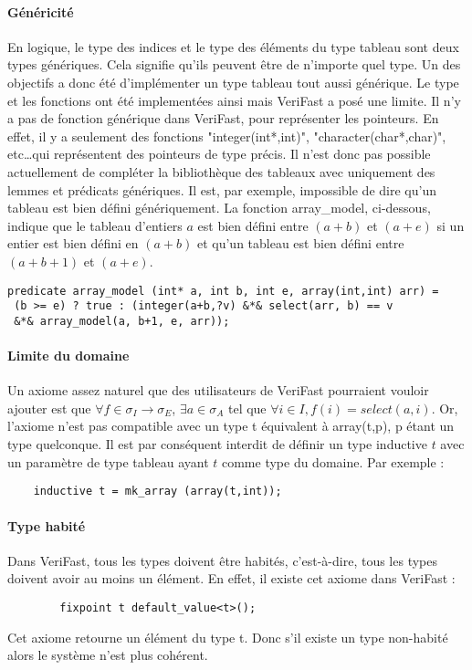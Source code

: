 \documentclass[11pt,openany]{article}
\newcommand{\verifast}{VeriFast}
\begin{document}
			\paragraph{G\'en\'ericit\'e}
			En logique, le type des indices et le type des \'el\'ements du type tableau sont deux types g\'en\'eriques. Cela signifie qu'ils peuvent \^etre de n'importe quel type. Un des objectifs a donc \'et\'e d'impl\'ementer un type tableau tout aussi g\'en\'erique. Le type et les fonctions ont \'et\'e implement\'ees ainsi mais \verifast{} a pos\'e une limite. Il n'y a pas de fonction g\'en\'erique dans \verifast, pour repr\'esenter les pointeurs. En effet, il y a seulement des fonctions "integer(int*,int)", "character(char*,char)", etc\ldots qui repr\'esentent des pointeurs de type pr\'ecis. Il n'est donc pas possible actuellement de compl\'eter la biblioth\`eque des tableaux avec uniquement des lemmes et pr\'edicats g\'en\'eriques. Il est, par exemple, impossible de dire qu'un tableau est bien d\'efini g\'en\'eriquement. La fonction array\_model, ci-dessous, indique que le tableau d'entiers $a$ est bien d\'efini entre $(a+b)$ et $(a+e)$ si un entier est bien d\'efini en $(a+b)$ et qu'un tableau est bien d\'efini entre $(a+b+1)$ et $(a+e)$.
\begin{lstlisting}
predicate array_model (int* a, int b, int e, array(int,int) arr) =
 (b >= e) ? true : (integer(a+b,?v) &*& select(arr, b) == v
 &*& array_model(a, b+1, e, arr));
\end{lstlisting}
			\paragraph{Limite du domaine}
			Un axiome assez naturel que des utilisateurs de \verifast{} pourraient vouloir ajouter est que $\forall f\in \sigma_I \rightarrow \sigma_E$, $\exists a\in \sigma_A$ tel que $\forall i\in I, f(i) = select(a,i)$.
		Or, l'axiome n'est pas compatible avec un type t \'equivalent \`a array(t,p), p \'etant un type quelconque. Il est par cons\'equent interdit de d\'efinir un type inductive $t$ avec un param\`etre de type tableau ayant $t$ comme type du domaine. Par exemple :
			\begin{lstlisting}			
    inductive t = mk_array (array(t,int));
			\end{lstlisting}
			\paragraph{Type habit\'e}
				Dans \verifast{}, tous les types doivent \^etre habit\'es, c'est-\`a-dire, tous les types doivent avoir au moins un \'el\'ement. En effet, il existe cet axiome dans \verifast{} :
		\begin{lstlisting}
		fixpoint t default_value<t>();
		\end{lstlisting}
		Cet axiome retourne un \'el\'ement du type t. Donc s'il existe un type non-habit\'e alors le syst\`eme n'est plus coh\'erent.
		
\end{document}

